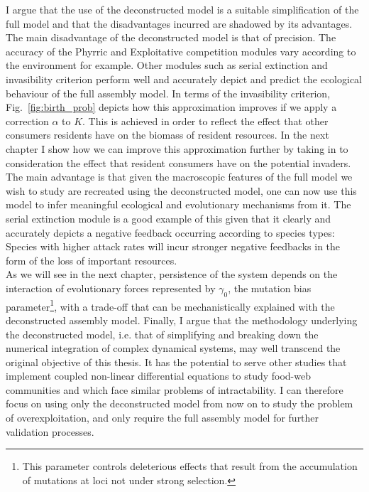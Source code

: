 \documentclass[a4paper]{report}
\begin{document}
I argue that the use of the deconstructed model is a suitable simplification of the full model and that the disadvantages incurred are shadowed by its advantages. The main disadvantage of the deconstructed model is that of precision. The accuracy of the Phyrric and Exploitative competition modules vary according to the environment for example. Other modules such as serial extinction and invasibility criterion perform well and accurately depict and predict the ecological behaviour of the full assembly model. In terms of the invasibility criterion, Fig.~\ref{fig:birth_prob} depicts how this approximation improves if we apply a correction $\alpha$ to $K$. This is achieved in order to reflect the effect that other consumers residents have on  the biomass of resident resources. In the next chapter I show how we can improve this approximation further by taking in to consideration the effect that resident consumers have on the potential invaders. The main advantage is that given the macroscopic features of the full model we wish to study are recreated using the deconstructed model, one can now use this model to infer meaningful ecological and evolutionary mechanisms from it. The serial extinction module is a good example of this given that it clearly and accurately depicts a negative feedback occurring according to species types: Species with higher attack rates will incur stronger negative feedbacks in the form of the loss of important resources. \\

 As we will see in the next chapter, persistence of the system depends on the interaction of evolutionary forces represented by $\gamma_0$, the mutation bias parameter\footnote{This parameter controls deleterious effects that result from the accumulation of mutations at loci not under strong selection.}, with a trade-off that can be mechanistically explained with the deconstructed assembly model. Finally, I argue that the methodology underlying the deconstructed model, i.e. that of simplifying and breaking down the numerical integration of complex dynamical systems, may well transcend the original objective of this thesis. It has the potential to serve other studies that implement coupled non-linear differential equations to study food-web communities and which face similar problems of intractability. I can therefore focus on using only the deconstructed model from now on to study the problem of overexploitation, and only require the full assembly model for further validation processes. \\
  
\end{document}
